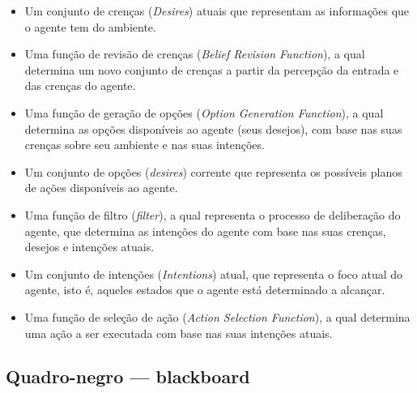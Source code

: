 \begin{itemize}
\item Um conjunto de crenças (\textit{Desires}) atuais que representam as informações que o agente tem do ambiente.~\cite{oliveira_BDI}
\item Uma função de revisão de crenças (\textit{Belief Revision Function}), a qual determina um novo conjunto de crenças a partir da percepção da entrada e das crenças do agente.~\cite{oliveira_BDI}
\item Uma função de geração de opções (\textit{Option Generation Function}), a qual determina as opções disponíveis ao agente (seus desejos), com base nas suas crenças sobre seu ambiente e nas suas intenções.~\cite{oliveira_BDI}
\item Um conjunto de opções (\textit{desires}) corrente que representa os possíveis planos de ações disponíveis ao agente.~\cite{oliveira_BDI}
\item Uma função de filtro (\textit{filter}), a qual representa o processo de deliberação do agente, que determina as intenções do agente com base nas suas crenças, desejos e intenções atuais.~\cite{oliveira_BDI}
\item Um conjunto de intenções (\textit{Intentions}) atual, que representa o foco atual do agente, isto é, aqueles estados que o agente está determinado a alcançar.~\cite{oliveira_BDI}
\item Uma função de seleção de ação (\textit{Action Selection Function}), a qual determina uma ação a ser executada com base nas suas intenções atuais.~\cite{oliveira_BDI}
\end{itemize}

\subsection{Quadro-negro --- blackboard}

